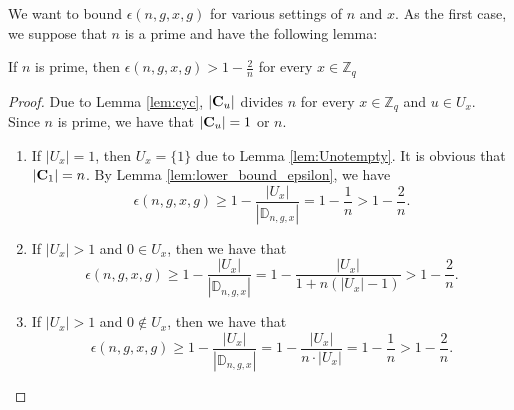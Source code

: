 \documentclass[JMC]{degruyter-journal}
\begin{document}
We want to bound $\epsilon(n,g,x,g)$ for various settings of $n$ and $x$.
As the first case, we suppose that $n$ is a prime and have the following lemma:

\begin{lemma}\label{lem:lower_bound_eta_for_prime_n}
If $n$ is  prime, then  $\displaystyle \epsilon(n,g,x,g)> 1-\frac{2}{n}$ for every $x\in \mathbb{Z}_q$
\end{lemma}

\begin{proof}
Due to Lemma \ref{lem:cyc}, $|{\bf C}_u|$ divides $n$ for every
$x\in \mathbb{Z}_q$ and $ u\in U_x$. Since $n$ is prime, we have
that $| {\bf C}_u|=1$ or $n$.
\begin{enumerate}
\item If $|U_x|=1$, then $U_x=\{1\}$ due to Lemma \ref{lem:Unotempty}. It is obvious that $|{\bf C}_1|=n$. By Lemma \ref{lem:lower_bound_epsilon},  we have
$$\epsilon(n,g,x,g)\geq1-\frac{|U_x|}{|\mathbb{D}_{n,g,x}|}=1-\frac{1}{n}>1-\frac{2}{n}.$$
\item If $| U_x|>1$ and $0\in U_x$, then we have that
$$\epsilon(n,g,x,g)\geq 1-\frac{|U_x|}{|\mathbb{D}_{n,g,x}|}=1-\frac{|U_x|}{1+n(|U_x|-1)}>1-\frac{2}{n}.$$
\item If $|U_x|>1$ and $0\notin U_x$, then we have that
$$\epsilon(n,g,x,g)\geq 1-\frac{|U_x|}{|\mathbb{D}_{n,g,x}|}=
1-\frac{|U_x|}{n\cdot |U_x|}
=1-\frac{1}{n}>1-\frac{2}{n}.$$
\end{enumerate}
\end{proof}
\end{document}
